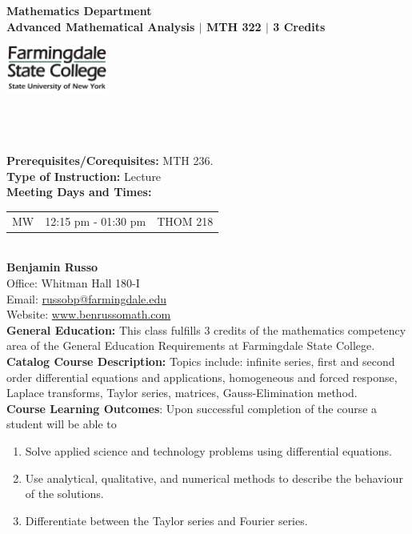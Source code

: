 \documentclass[11pt]{article}
\begin{document}
\begin{minipage}[]{.7\textwidth}
{\bf Mathematics Department}\\
{\bf Advanced Mathematical Analysis $\mid$ MTH 322 $\mid$ 3 Credits}
\end{minipage}\begin{minipage}[]{.3\textwidth}\begin{flushright}\includegraphics[height=1.5cm]{farmingdalelogo.jpg}\end{flushright}\end{minipage}\\
\ \\ 
\ \\
{\bf Prerequisites/Corequisites:} MTH 236.\\

{\bf Type of Instruction: }Lecture\\

{\bf Meeting Days and Times: }\begin{tabular}[t]{rrr}
MW & 12:15 pm - 01:30 pm & THOM 218\\
\end{tabular}\\

{\bf Benjamin Russo}\\
Office: Whitman Hall 180-I\\
Email:  \href{mailto:russobp@farmingdale.edu}{russobp@farmingdale.edu}\\
Website: \href{http://www.benrussomath.com}{www.benrussomath.com}\\

{\bf General Education:}
This class fulfills 3 credits of the mathematics competency area of the General Education Requirements at Farmingdale State College.\\

{\bf Catalog Course Description:}
Topics include: infinite series, first and second order differential equations and applications, homogeneous and forced response, Laplace transforms, Taylor series, matrices, Gauss-Elimination method.\\

{\bf Course Learning Outcomes}: Upon successful completion of the course a student will be able to 
\begin{enumerate}[---]
\item Solve applied science and technology problems using differential equations.
\item Use analytical, qualitative, and numerical methods to describe the behaviour of the solutions. 
\item Differentiate between the Taylor series and Fourier series. 
\end{enumerate}
\end{document}
